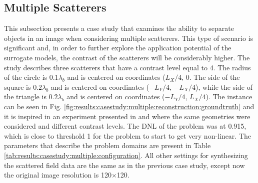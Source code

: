 		\subsection{Multiple Scatterers}\label{chap:results:casestudy:multiple}
		
	
			This subsection presents a case study that examines the ability to separate objects in an image when considering multiple scatterers. This type of scenario is significant and, in order to further explore the application potential of the surrogate models, the contrast of the scatterers will be considerably higher. The study describes three scatterers that have a contrast level equal to 4. The radius of the circle is $0.1\lambda_b$ and is centered on coordinates ($L_X/4$, $0$. The side of the square is $0.2\lambda_b$ and is centered on coordinates ($-L_Y/4$, $-L_X/4$), while the side of the triangle is $0.2\lambda_b$ and is centered on coordinates ($-L_Y/4$, $L_X/4$). The instance can be seen in Fig. \ref{fig:results:casestudy:multiple:reconstruction:groundtruth} and it is inspired in an experiment presented in \citep{shah2015fast} and \citep{batista2021quadratic} where the same geometries were considered and different contrast levels. The DNL of the problem was at 0.915, which is close to threshold 1 for the problem to start to get very non-linear. The parameters that describe the problem domains are present in Table \ref{tab:results:casestudy:multiple:configuration}. All other settings for synthesizing the scattered field data are the same as in the previous case study, except now the original image resolution is 120$\times$120.
			
